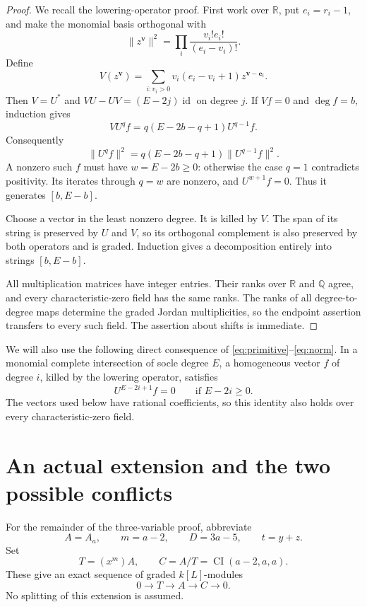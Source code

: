 \documentclass[11pt]{amsart}
\theoremstyle{definition}
\newcommand{\CI}{\operatorname{CI}}
\newcommand{\R}{\mathbb R}
\newcommand{\Q}{\mathbb Q}
\begin{document}
\begin{proof}
We recall the lowering-operator proof. First work over $\R$, put
$e_i=r_i-1$, and make the monomial basis orthogonal with
\[
 \|z^{\mathbf v}\|^2
 =\prod_i\frac{v_i!e_i!}{(e_i-v_i)!}.
\]
Define
\[
 V(z^{\mathbf v})
 =\sum_{i:v_i>0}v_i(e_i-v_i+1)z^{\mathbf v-\mathbf e_i}.
\]
Then $V=U^*$ and $VU-UV=(E-2j)\operatorname{id}$ on degree $j$.
If $Vf=0$ and $\deg f=b$, induction gives
\begin{equation}\label{eq:primitive}
 VU^qf=q(E-2b-q+1)U^{q-1}f.
\end{equation}
Consequently
\begin{equation}\label{eq:norm}
 \|U^qf\|^2=q(E-2b-q+1)\|U^{q-1}f\|^2.
\end{equation}
A nonzero such $f$ must have $w=E-2b\ge0$: otherwise the case $q=1$
contradicts positivity. Its iterates through $q=w$ are nonzero, and
$U^{w+1}f=0$. Thus it generates $[b,E-b]$.

Choose a vector in the least nonzero degree. It is killed by $V$.
The span of its string is preserved by $U$ and $V$, so its orthogonal
complement is also preserved by both operators and is graded. Induction
gives a decomposition entirely into strings $[b,E-b]$.

All multiplication matrices have integer entries. Their ranks over
$\R$ and $\Q$ agree, and every characteristic-zero field has the same
ranks. The ranks of all degree-to-degree maps determine the graded Jordan
multiplicities, so the endpoint assertion transfers to every such field.
The assertion about shifts is immediate.
\end{proof}

We will also use the following direct consequence of
\eqref{eq:primitive}--\eqref{eq:norm}. In a monomial complete intersection
of socle degree $E$, a homogeneous vector $f$ of degree $i$, killed by the
lowering operator, satisfies
\begin{equation}\label{eq:primitive-kernel}
 U^{E-2i+1}f=0\qquad\text{if }E-2i\ge0.
\end{equation}
The vectors used below have rational coefficients, so this identity also
holds over every characteristic-zero field.

\section{An actual extension and the two possible conflicts}

For the remainder of the three-variable proof, abbreviate
\[
 A=A_a,\qquad m=a-2,\qquad D=3a-5,\qquad t=y+z.
\]
Set
\[
 T=(x^m)A,\qquad
 C=A/T=\CI(a-2,a,a).
\]
These give an exact sequence of graded $k[L]$-modules
\begin{equation}\label{eq:extension}
 0\longrightarrow T\longrightarrow A\longrightarrow C\longrightarrow0.
\end{equation}
No splitting of this extension is assumed.
\end{document}

